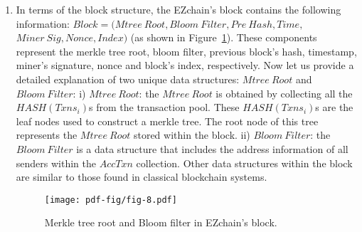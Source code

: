 \documentclass[conference]{IEEEtran}
\begin{document}
\begin{enumerate}
    \item In terms of the block structure, the EZchain's block contains the following information: $Block = (Mtree~Root, Bloom~Filter, Pre~Hash, Time,$ $ Miner~Sig, Nonce, Index)$ (as shown in Figure~\ref{fig:Merkle tree and Bloom filter}). These components represent the merkle tree root, bloom filter, previous block's hash, timestamp, miner's signature, nonce and block's index, respectively. Now let us provide a detailed explanation of two unique data structures: $Mtree~Root$ and $Bloom~Filter$: i)  $Mtree~Root$: the $Mtree~Root$ is obtained by collecting all the $HASH(Txns_i)$s from the transaction pool. These $HASH(Txns_i)$s are the leaf nodes used to construct a merkle tree. The root node of this tree represents the $Mtree~Root$ stored within the block. ii) $Bloom~Filter$: the $Bloom~Filter$ is a data structure that includes the address information of all senders within the $AccTxn$ collection. Other data structures within the block are similar to those found in classical blockchain systems.
    \begin{figure}[htp!]
        \centering
        \texttt{[image: pdf-fig/fig-8.pdf]}
        \caption{Merkle tree root and Bloom filter in EZchain's block.}
        \label{fig:Merkle tree and Bloom filter}
    \end{figure}


\end{enumerate}
\end{document}
